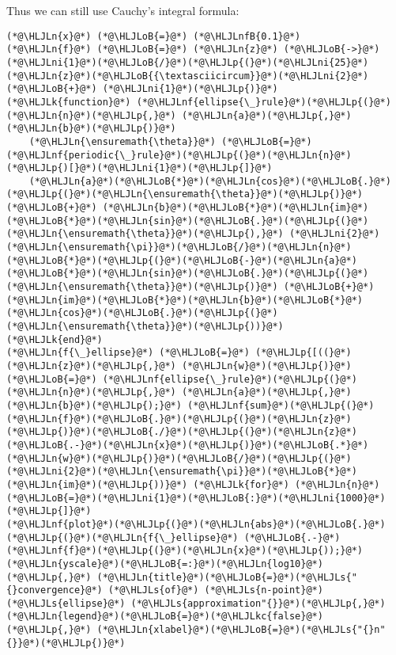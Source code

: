 \documentclass[12pt,a4paper]{article}
\newcommand{\HLJLk}[1]{\textcolor[RGB]{148,91,176}{\textbf{#1}}}
\newcommand{\HLJLkc}[1]{\textcolor[RGB]{59,151,46}{\textit{#1}}}
\newcommand{\HLJLn}[1]{#1}
\newcommand{\HLJLnf}[1]{\textcolor[RGB]{66,102,213}{#1}}
\newcommand{\HLJLs}[1]{\textcolor[RGB]{201,61,57}{#1}}
\newcommand{\HLJLnfB}[1]{\textcolor[RGB]{59,151,46}{#1}}
\newcommand{\HLJLni}[1]{\textcolor[RGB]{59,151,46}{#1}}
\newcommand{\HLJLoB}[1]{\textcolor[RGB]{102,102,102}{\textbf{#1}}}
\newcommand{\HLJLp}[1]{#1}
\begin{document}
Thus we can still use Cauchy's integral formula:


\begin{lstlisting}
(*@\HLJLn{x}@*) (*@\HLJLoB{=}@*) (*@\HLJLnfB{0.1}@*)
(*@\HLJLn{f}@*) (*@\HLJLoB{=}@*) (*@\HLJLn{z}@*) (*@\HLJLoB{->}@*) (*@\HLJLni{1}@*)(*@\HLJLoB{/}@*)(*@\HLJLp{(}@*)(*@\HLJLni{25}@*)(*@\HLJLn{z}@*)(*@\HLJLoB{{\textasciicircum}}@*)(*@\HLJLni{2}@*) (*@\HLJLoB{+}@*) (*@\HLJLni{1}@*)(*@\HLJLp{)}@*)
(*@\HLJLk{function}@*) (*@\HLJLnf{ellipse{\_}rule}@*)(*@\HLJLp{(}@*)(*@\HLJLn{n}@*)(*@\HLJLp{,}@*) (*@\HLJLn{a}@*)(*@\HLJLp{,}@*) (*@\HLJLn{b}@*)(*@\HLJLp{)}@*)
    (*@\HLJLn{\ensuremath{\theta}}@*) (*@\HLJLoB{=}@*) (*@\HLJLnf{periodic{\_}rule}@*)(*@\HLJLp{(}@*)(*@\HLJLn{n}@*)(*@\HLJLp{)[}@*)(*@\HLJLni{1}@*)(*@\HLJLp{]}@*)
    (*@\HLJLn{a}@*)(*@\HLJLoB{*}@*)(*@\HLJLn{cos}@*)(*@\HLJLoB{.}@*)(*@\HLJLp{(}@*)(*@\HLJLn{\ensuremath{\theta}}@*)(*@\HLJLp{)}@*) (*@\HLJLoB{+}@*) (*@\HLJLn{b}@*)(*@\HLJLoB{*}@*)(*@\HLJLn{im}@*)(*@\HLJLoB{*}@*)(*@\HLJLn{sin}@*)(*@\HLJLoB{.}@*)(*@\HLJLp{(}@*)(*@\HLJLn{\ensuremath{\theta}}@*)(*@\HLJLp{),}@*) (*@\HLJLni{2}@*)(*@\HLJLn{\ensuremath{\pi}}@*)(*@\HLJLoB{/}@*)(*@\HLJLn{n}@*)(*@\HLJLoB{*}@*)(*@\HLJLp{(}@*)(*@\HLJLoB{-}@*)(*@\HLJLn{a}@*)(*@\HLJLoB{*}@*)(*@\HLJLn{sin}@*)(*@\HLJLoB{.}@*)(*@\HLJLp{(}@*)(*@\HLJLn{\ensuremath{\theta}}@*)(*@\HLJLp{)}@*) (*@\HLJLoB{+}@*) (*@\HLJLn{im}@*)(*@\HLJLoB{*}@*)(*@\HLJLn{b}@*)(*@\HLJLoB{*}@*)(*@\HLJLn{cos}@*)(*@\HLJLoB{.}@*)(*@\HLJLp{(}@*)(*@\HLJLn{\ensuremath{\theta}}@*)(*@\HLJLp{))}@*)
(*@\HLJLk{end}@*)
(*@\HLJLn{f{\_}ellipse}@*) (*@\HLJLoB{=}@*) (*@\HLJLp{[((}@*)(*@\HLJLn{z}@*)(*@\HLJLp{,}@*) (*@\HLJLn{w}@*)(*@\HLJLp{)}@*) (*@\HLJLoB{=}@*) (*@\HLJLnf{ellipse{\_}rule}@*)(*@\HLJLp{(}@*)(*@\HLJLn{n}@*)(*@\HLJLp{,}@*) (*@\HLJLn{a}@*)(*@\HLJLp{,}@*) (*@\HLJLn{b}@*)(*@\HLJLp{);}@*) (*@\HLJLnf{sum}@*)(*@\HLJLp{(}@*)(*@\HLJLn{f}@*)(*@\HLJLoB{.}@*)(*@\HLJLp{(}@*)(*@\HLJLn{z}@*)(*@\HLJLp{)}@*)(*@\HLJLoB{./}@*)(*@\HLJLp{(}@*)(*@\HLJLn{z}@*)(*@\HLJLoB{.-}@*)(*@\HLJLn{x}@*)(*@\HLJLp{)}@*)(*@\HLJLoB{.*}@*)(*@\HLJLn{w}@*)(*@\HLJLp{)}@*)(*@\HLJLoB{/}@*)(*@\HLJLp{(}@*)(*@\HLJLni{2}@*)(*@\HLJLn{\ensuremath{\pi}}@*)(*@\HLJLoB{*}@*)(*@\HLJLn{im}@*)(*@\HLJLp{))}@*) (*@\HLJLk{for}@*) (*@\HLJLn{n}@*)(*@\HLJLoB{=}@*)(*@\HLJLni{1}@*)(*@\HLJLoB{:}@*)(*@\HLJLni{1000}@*)(*@\HLJLp{]}@*)
(*@\HLJLnf{plot}@*)(*@\HLJLp{(}@*)(*@\HLJLn{abs}@*)(*@\HLJLoB{.}@*)(*@\HLJLp{(}@*)(*@\HLJLn{f{\_}ellipse}@*) (*@\HLJLoB{.-}@*) (*@\HLJLnf{f}@*)(*@\HLJLp{(}@*)(*@\HLJLn{x}@*)(*@\HLJLp{));}@*) (*@\HLJLn{yscale}@*)(*@\HLJLoB{=:}@*)(*@\HLJLn{log10}@*)(*@\HLJLp{,}@*) (*@\HLJLn{title}@*)(*@\HLJLoB{=}@*)(*@\HLJLs{"{}convergence}@*) (*@\HLJLs{of}@*) (*@\HLJLs{n-point}@*) (*@\HLJLs{ellipse}@*) (*@\HLJLs{approximation"{}}@*)(*@\HLJLp{,}@*) (*@\HLJLn{legend}@*)(*@\HLJLoB{=}@*)(*@\HLJLkc{false}@*)(*@\HLJLp{,}@*) (*@\HLJLn{xlabel}@*)(*@\HLJLoB{=}@*)(*@\HLJLs{"{}n"{}}@*)(*@\HLJLp{)}@*)
\end{lstlisting}
\end{document}
